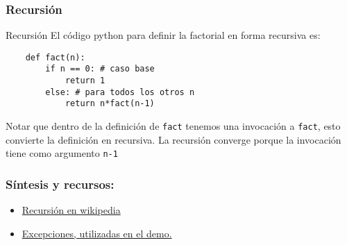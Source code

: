 \documentclass{beamer}
\begin{document}
\begin{frame}[fragile]
    \frametitle{Recursión}
    \begin{block}{Recursión}
    El código python para definir la factorial en forma recursiva es:
    \begin{verbatim}
    def fact(n):
        if n == 0: # caso base
            return 1 
        else: # para todos los otros n
            return n*fact(n-1) 
    \end{verbatim}
    Notar que dentro de la definición de \texttt{fact} tenemos una invocación a \texttt{fact}, esto
    convierte la definición en recursiva. La recursión converge porque la invocación tiene como argumento \texttt{n-1}
    \end{block}
\end{frame}

\begin{frame}
\frametitle{Síntesis y recursos:}

\begin{itemize}
\item \href{https://bit.ly/2GsZnhX}{Recursión en wikipedia}
\item \href{https://bit.ly/34AKNg7}{Excepciones, utilizadas en el demo.}
\end{itemize}
\end{frame}
\end{document}
